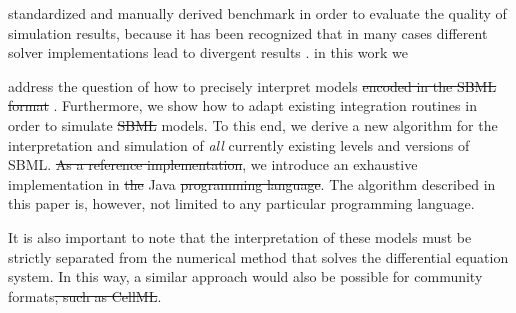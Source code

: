 \documentclass[10pt]{bmc_article}
\newenvironment{bmcformat}{\begin{raggedright}\baselineskip20pt\sloppy\setboolean{publ}{false}}{\end{raggedright}\baselineskip20pt\sloppy}
\begin{document}
\begin{bmcformat}
 standardized and manually derived benchmark
 in order to evaluate the quality of simulation results, because it
has been recognized that in many cases different solver implementations lead to
divergent results \cite{Bergmann2008}.
in this work we
 
 address the question of how to precisely interpret  models
\sout{encoded in the \acs{SBML} format} .
Furthermore, we show how to adapt existing  integration routines
in order to simulate \sout{\acs{SBML}} models.
To this end, we derive a new algorithm for the  interpretation and 
simulation of \emph{all} currently existing levels and versions of \acs{SBML}.
\sout{As a reference implementation},
we introduce an exhaustive  implementation in \sout{the}
Java\texttrademark\sout{ programming language}. The algorithm described in this paper
is, however, not limited to any particular programming language.

It is also important to note that the interpretation of these models must be strictly
separated from the numerical method that solves the  differential
equation system. In this way, a similar approach would also be possible for
 community formats\sout{, such as CellML}.


\end{bmcformat}
\end{document}
